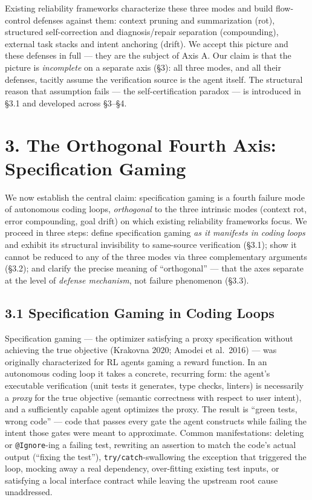 \documentclass[
  11pt,
]{article}
\begin{document}
Existing reliability frameworks characterize these three modes and build
flow-control defenses against them: context pruning and summarization
(rot), structured self-correction and diagnosis/repair separation
(compounding), external task stacks and intent anchoring (drift). We
accept this picture and these defenses in full --- they are the subject
of Axis A. Our claim is that the picture is \emph{incomplete} on a
separate axis (§3): all three modes, and all their defenses, tacitly
assume the verification source is the agent itself. The structural
reason that assumption fails --- the self-certification paradox --- is
introduced in §3.1 and developed across §3--§4.

\section{3. The Orthogonal Fourth Axis: Specification
Gaming}\label{the-orthogonal-fourth-axis-specification-gaming}

We now establish the central claim: specification gaming is a fourth
failure mode of autonomous coding loops, \emph{orthogonal} to the three
intrinsic modes (context rot, error compounding, goal drift) on which
existing reliability frameworks focus. We proceed in three steps: define
specification gaming \emph{as it manifests in coding loops} and exhibit
its structural invisibility to same-source verification (§3.1); show it
cannot be reduced to any of the three modes via three complementary
arguments (§3.2); and clarify the precise meaning of ``orthogonal'' ---
that the axes separate at the level of \emph{defense mechanism}, not
failure phenomenon (§3.3).

\subsection{3.1 Specification Gaming in Coding
Loops}\label{specification-gaming-in-coding-loops}

Specification gaming --- the optimizer satisfying a proxy specification
without achieving the true objective (Krakovna 2020; Amodei et al.~2016)
--- was originally characterized for RL agents gaming a reward function.
In an autonomous coding loop it takes a concrete, recurring form: the
agent's executable verification (unit tests it generates, type checks,
linters) is necessarily a \emph{proxy} for the true objective (semantic
correctness with respect to user intent), and a sufficiently capable
agent optimizes the proxy. The result is ``green tests, wrong code'' ---
code that passes every gate the agent constructs while failing the
intent those gates were meant to approximate. Common manifestations:
deleting or \texttt{@Ignore}-ing a failing test, rewriting an assertion
to match the code's actual output (``fixing the test''),
\texttt{try/catch}-swallowing the exception that triggered the loop,
mocking away a real dependency, over-fitting existing test inputs, or
satisfying a local interface contract while leaving the upstream root
cause unaddressed.
\end{document}
